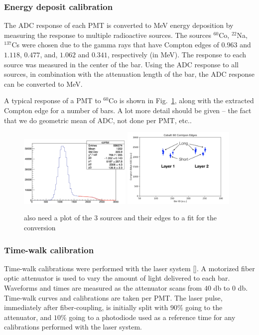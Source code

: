 \documentclass[review]{elsarticle}
\begin{document}
\subsubsection{Energy deposit calibration}
The ADC response of each PMT is converted to \si{\mega\electronvolt} energy deposition by measuring the response to 
multiple radioactive sources. The sources $^{60}$Co, $^{22}$Na, $^{137}$Cs were chosen due to the gamma rays that have 
Compton edges of $0.963$ and $1.118$, $0.477$, and, $1.062$ and $0.341$, respectively (in \si{\mega\electronvolt}). The 
response to each source was measured in the center of the bar. Using the ADC response to all sources, in combination with the 
attenuation length of the bar, the ADC response can be converted to \si{\mega\electronvolt}.

A typical response of a PMT to  $^{60}$Co is shown in Fig.~\ref{fig:mev_conversion}, along with the extracted Compton edge for a 
number of bars. {\color{red}A lot more detail should be given -- the fact that we do geometric mean of ADC, not done per PMT, etc.. }

\begin{figure}[h!]
	\centering
		\includegraphics[width=0.48\textwidth]{co-compton.png}
		\includegraphics[width=0.48\textwidth]{coedges.png}
	\caption{{\color{red}also need a plot of the 3 sources and their edges to a fit for the conversion}}
	\label{fig:mev_conversion}
\end{figure}

\subsubsection{Time-walk calibration}
Time-walk calibrations were performed with the laser system [{\color{red}{CITE}}]. A motorized fiber optic attenuator is used to vary
the amount of light delivered to each bar. Waveforms and times are measured as the attenuator scans from $40$ \si{\decibel} to $0$ 
\si{\decibel}. Time-walk curves and calibrations are taken per PMT. The laser pulse, immediately after fiber-coupling, is initially 
split with $90\%$ going to the attenuator, and $10\%$ going to a photodiode used as a reference time for any calibrations 
performed with the laser system.
\end{document}
